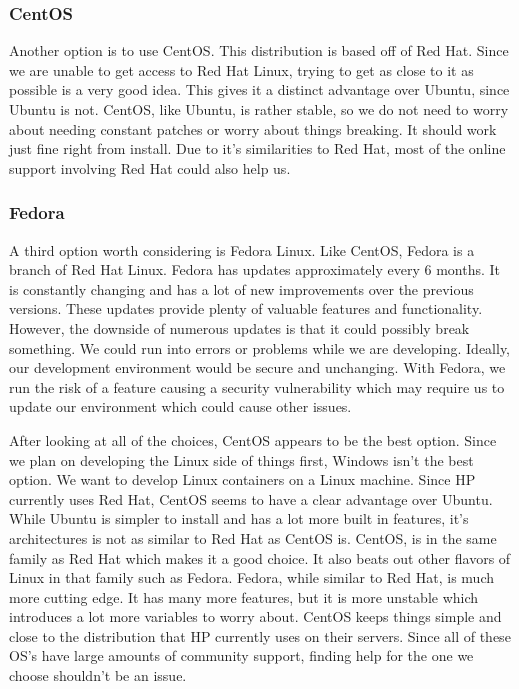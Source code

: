 \documentclass[onecolumn, draftclsnofoot,10pt, compsoc]{IEEEtran}
\begin{document}
\subsubsection{CentOS}
Another option is to use CentOS. This distribution is based off of Red Hat. Since we are unable to get access to Red Hat Linux, trying to get as close to it as possible is a very good idea. This gives it a distinct advantage over Ubuntu, since Ubuntu is not. CentOS, like Ubuntu, is rather stable, so we do not need to worry about needing constant patches or worry about things breaking. It should work just fine right from install. Due to it's similarities to Red Hat, most of the online support involving Red Hat could also help us.\cite{rh_vs_deb} 

\subsubsection{Fedora}
A third option worth considering is Fedora Linux. Like CentOS, Fedora is a branch of Red Hat Linux. Fedora has updates approximately every 6 months.\cite{cent_vs_fed} It is constantly changing and has a lot of new improvements over the previous versions. These updates provide plenty of valuable features and functionality. However, the downside of numerous updates is that it could possibly break something. We could run into errors or problems while we are developing. Ideally, our development environment would be secure and unchanging. With Fedora, we run the risk of a feature causing a security vulnerability which may require us to update our environment which could cause other issues. \cite{cent_vs_fed}

After looking at all of the choices, CentOS appears to be the best option. Since we plan on developing the Linux side of things first, Windows isn't the best option. We want to develop Linux containers on a Linux machine. Since HP currently uses Red Hat, CentOS seems to have a clear advantage over Ubuntu. While Ubuntu is simpler to install and has a lot more built in features, it’s architectures is not as similar to Red Hat as CentOS is. CentOS, is in the same family as Red Hat which makes it a good choice. It also beats out other flavors of Linux in that family such as Fedora. Fedora, while similar to Red Hat, is much more cutting edge. It has many more features, but it is more unstable which introduces a lot more variables to worry about. CentOS keeps things simple and close to the distribution that HP currently uses on their servers. Since all of these OS's have large amounts of community support, finding help for the one we choose shouldn't be an issue.
\end{document}
